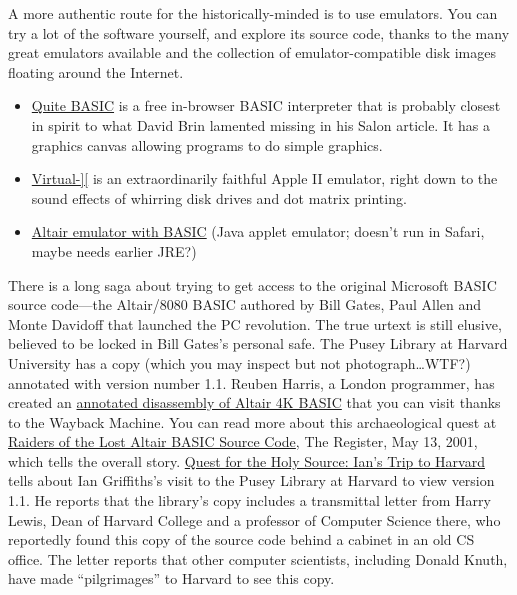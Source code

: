 \documentclass{article}
\begin{document}
A more authentic route for the historically-minded is to use emulators.
You can try a lot of the software yourself, and explore
its source code, thanks to the many great emulators available and the
collection of emulator-compatible disk images floating around the Internet.

\begin{itemize}

\item \href{http://quitebasic.com}{Quite BASIC} is a free in-browser BASIC
  interpreter that is probably closest in spirit to what David Brin
  lamented missing in his Salon article.  It has a graphics canvas
  allowing programs to do simple graphics.

\item \href{http://virtualii.com}{Virtual-][} is an extraordinarily
  faithful Apple II emulator, right down to the sound effects of
  whirring disk drives and dot matrix printing.

\item \href{http://web.archive.org/web/20011211231432/http://www.rjh.org.uk/altair/4k/em/altem.htm}{Altair emulator with BASIC} (Java applet emulator; doesn't run in Safari,
maybe needs earlier JRE?)

\end{itemize}



There is a long saga about trying to get access to the original
Microsoft BASIC source code---the Altair/8080 BASIC authored by Bill
Gates, Paul Allen and Monte Davidoff that launched the PC revolution.
The true urtext is still elusive, believed to be locked in Bill Gates's
personal safe.
The Pusey Library at Harvard University has a copy (which you may
inspect but not photograph\ldots{}WTF?) annotated with version number
1.1.
Reuben Harris, a London programmer, has created an
\href{http://web.archive.org/web/20011211233332/www.rjh.org.uk/altair/4k/index2.html}{annotated
disassembly of Altair 4K BASIC} that you can visit thanks to the
Wayback Machine.
You can read more about this archaeological quest at
\href{http://www.theregister.co.uk/2001/05/13/raiders_of_the_lost_altair/}{Raiders
of the Lost Altair BASIC Source Code}, The Register, May 13, 2001,
which tells the overall story.
\href{http://www.interact-sw.co.uk/altair/other\%20versions/ian.htm}{Quest
for the Holy Source: Ian's Trip to Harvard} tells about Ian
Griffiths's visit to the Pusey Library at Harvard to view version
1.1.
He reports that the library's copy includes a transmittal letter from
Harry Lewis, Dean of Harvard College and a professor of Computer
Science there, who reportedly found this copy of the source code behind
a cabinet in an old CS office.
The letter reports that other computer scientists, including Donald
Knuth, have made ``pilgrimages'' to Harvard to see this copy.
\end{document}
